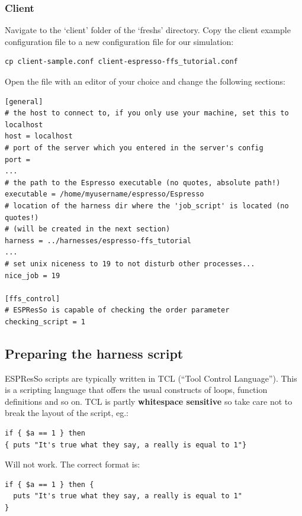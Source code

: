\documentclass[a4paper,oneside]{article}
\newenvironment{mylisting}
{\begin{list}{}{\setlength{\leftmargin}{1em}}\item\scriptsize\bfseries}
{\end{list}}
\begin{document}
\subsubsection{Client}
Navigate to the `client' folder of the `freshs' directory. Copy the client example configuration file to a new configuration file for our simulation:
\begin{mylisting}
\begin{verbatim}
cp client-sample.conf client-espresso-ffs_tutorial.conf
\end{verbatim}
\end{mylisting}
Open the file with an editor of your choice and change the following sections:
\begin{mylisting}
\begin{verbatim}
[general]
# the host to connect to, if you only use your machine, set this to localhost
host = localhost
# port of the server which you entered in the server's config
port = 
...
# the path to the Espresso executable (no quotes, absolute path!)
executable = /home/myusername/espresso/Espresso
# location of the harness dir where the 'job_script' is located (no quotes!)
# (will be created in the next section)
harness = ../harnesses/espresso-ffs_tutorial
...
# set unix niceness to 19 to not disturb other processes...
nice_job = 19

[ffs_control]
# ESPResSo is capable of checking the order parameter
checking_script = 1
\end{verbatim}
\end{mylisting}


\subsection{Preparing the harness script}

ESPResSo scripts are typically written in TCL (``Tool Control Language'').  This is a scripting language that offers the usual constructs of loops, function definitions and so on.  TCL is partly {\bf whitespace sensitive} so take care not to break the layout of the script, eg.: 
\begin{mylisting}
\begin{verbatim}
if { $a == 1 } then 
{ puts "It's true what they say, a really is equal to 1"}
\end{verbatim}
\end{mylisting}

Will not work. The correct format is:
\begin{mylisting}
\begin{verbatim}
if { $a == 1 } then { 
  puts "It's true what they say, a really is equal to 1"
}
\end{verbatim}
\end{mylisting}
\end{document}
